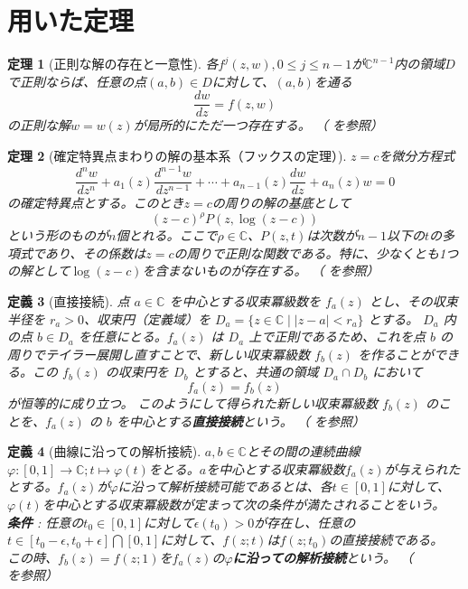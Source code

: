 \documentclass[paper=a4, fontsize=11pt]{jlreq} %
\theoremstyle{break}
\newtheorem{theorem}{定理}[section]
\newtheorem{definition}[theorem]{定義}
\theoremstyle{qa}
\theoremstyle{remark} %
\begin{document}
\section{用いた定理}%
\begin{theorem}[正則な解の存在と一意性]\label{thm:cauchy}
    各$f^{j}(z,w),0\leq j\leq n-1$が$\mathbb{C}^{n-1}$内の領域$D$で正則ならば、任意の点$(a,b)\in D$に対して、$(a,b)$を通る
    \begin{equation}\label{eq:cauchy_problem}
    \frac{dw}{dz}=f(z,w)
    \end{equation}
    の正則な解$w=w(z)$が局所的にただ一つ存在する。
    （\cite[p.50 定理8.1]{book:takano} を参照）
\end{theorem}
\begin{theorem}[確定特異点まわりの解の基本系（フックスの定理）]\label{thm:fuchs}
    $z=c$を微分方程式
    \begin{equation}\label{eq:nth_order_linear_ode}
    \frac{d^{n}w}{dz^{n}}+a_{1}(z)\frac{d^{n-1}w}{dz^{n-1}}+\cdots+a_{n-1}(z)\frac{dw}{dz}+a_{n}(z)w=0
    \end{equation}
    の確定特異点とする。このとき$z=c$の周りの解の基底として
    \[
    (z-c)^{\rho}P(z,\log(z-c))
    \]
    という形のものが$n$個とれる。ここで$\rho\in \mathbb{C}$、$P(z,t)$は次数が$n-1$以下の$t$の多項式であり、その係数は$z=c$の周りで正則な関数である。特に、少なくとも1つの解として$\log(z-c)$を含まないものが存在する。
    （\cite[p.119 定理13.1]{book:takano} を参照）
\end{theorem}
\begin{definition}[直接接続]
    点 $a \in \mathbb{C}$ を中心とする収束冪級数を $f_a(z)$ とし、その収束半径を $r_a > 0$、収束円（定義域）を $D_a = \{z \in \mathbb{C} \mid |z - a| < r_a\}$ とする。
    $D_a$ 内の点 $b \in D_a$ を任意にとる。$f_a(z)$ は $D_a$ 上で正則であるため、これを点 $b$ の周りでテイラー展開し直すことで、新しい収束冪級数 $f_b(z)$ を作ることができる。この $f_b(z)$ の収束円を $D_b$ とすると、共通の領域 $D_a \cap D_b$ において
    \[
    f_a(z) = f_b(z)
    \]
    が恒等的に成り立つ。
    このようにして得られた新しい収束冪級数 $f_b(z)$ のことを、$f_a(z)$ の $b$ を中心とする\textbf{直接接続}という。
    （\cite[p.101]{book:kimura} を参照）
\end{definition}
\begin{definition}[曲線に沿っての解析接続]
    $a,b\in\mathbb{C}$とその間の連続曲線$\varphi:[0,1]\to\mathbb{C};t\mapsto \varphi(t)$をとる。$a$を中心とする収束冪級数$f_{a}(z)$が与えられたとする。$f_{a}(z)$が$\varphi$に沿って解析接続可能であるとは、各$t\in[0,1]$に対して、$\varphi(t)$を中心とする収束冪級数が定まって次の条件が満たされることをいう。\\
    \textbf{条件} : 任意の$t_{0}\in[0,1]$に対して$\epsilon(t_{0})>0$が存在し、任意の$t\in[t_{0}-\epsilon,t_{0}+\epsilon]\bigcap[0,1]$に対して、$f(z;t)$は$f(z;t_{0})$の直接接続である。\\
    この時、$f_{b}(z)=f(z;1)$を$f_{a}(z)$の\textbf{$\varphi$に沿っての解析接続}という。
    （\cite[p.119 定義21.1]{book:kimura} を参照）
\end{definition}
\end{document}
